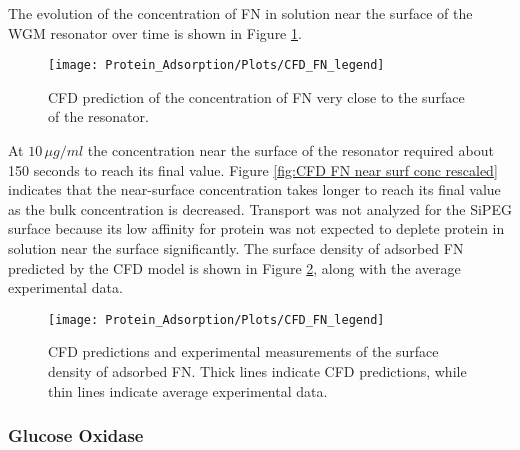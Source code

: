 The evolution of the concentration of FN in solution near the surface
of the WGM resonator over time is shown in Figure \ref{fig:CFD Bulk Conc}.%
\begin{figure}

\texttt{[image: Protein\_Adsorption/Plots/CFD\_FN\_legend]}\caption{\label{fig:CFD Bulk Conc}CFD prediction of the concentration of FN
very close to the surface of the resonator.}


%
\end{figure}
 At $10\,\mu g/ml$ the concentration near the surface of the resonator
required about 150 seconds to reach its final value. Figure \ref{fig:CFD FN near surf conc rescaled}
indicates that the near-surface concentration takes longer to reach
its final value as the bulk concentration is decreased. Transport
was not analyzed for the SiPEG surface because its low affinity for
protein was not expected to deplete protein in solution near the surface
significantly. The surface density of adsorbed FN predicted by the
CFD model is shown in Figure \ref{fig:CFD near surface conc}, along
with the average experimental data.%
\begin{figure}

\texttt{[image: Protein\_Adsorption/Plots/CFD\_FN\_legend]}

\caption{\label{fig:CFD near surface conc}CFD predictions and experimental
measurements of the surface density of adsorbed FN. Thick lines indicate
CFD predictions, while thin lines indicate average experimental data.}


%
\end{figure}



\subsubsection{Glucose Oxidase}

